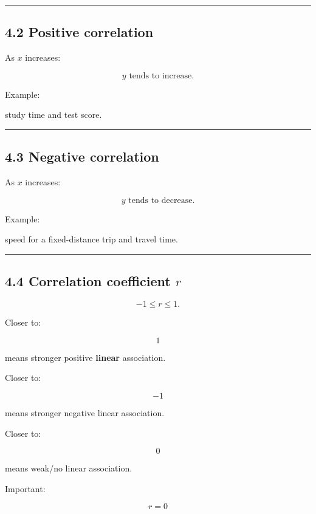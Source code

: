 \documentclass[
]{article}
\begin{document}
\begin{center}\rule{0.5\linewidth}{0.5pt}\end{center}

\subsection{4.2 Positive correlation}\label{positive-correlation}

As \(x\) increases:

\[
y\text{ tends to increase}.
\]

Example:

study time and test score.

\begin{center}\rule{0.5\linewidth}{0.5pt}\end{center}

\subsection{4.3 Negative correlation}\label{negative-correlation}

As \(x\) increases:

\[
y\text{ tends to decrease}.
\]

Example:

speed for a fixed-distance trip and travel time.

\begin{center}\rule{0.5\linewidth}{0.5pt}\end{center}

\subsection{\texorpdfstring{4.4 Correlation coefficient
\(r\)}{4.4 Correlation coefficient r}}\label{correlation-coefficient-r}

\[
\boxed{-1\le r\le1}.
\]

Closer to:

\[
1
\]

means stronger positive \textbf{linear} association.

Closer to:

\[
-1
\]

means stronger negative linear association.

Closer to:

\[
0
\]

means weak/no linear association.

Important:

\[
r=0
\]
\end{document}

